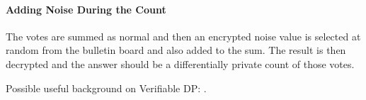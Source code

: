 \documentclass[10pt,a4paper]{article}
\begin{document}
\paragraph{Adding Noise During the Count}

The votes are summed as normal and then an encrypted noise value is selected at random from the bulletin board and also added to the sum. The result is then decrypted and the answer should be a differentially private count of those votes.

Possible useful background on Verifiable DP: \cite{narayan2015verifiable,kato2021preventing}.




\end{document}
